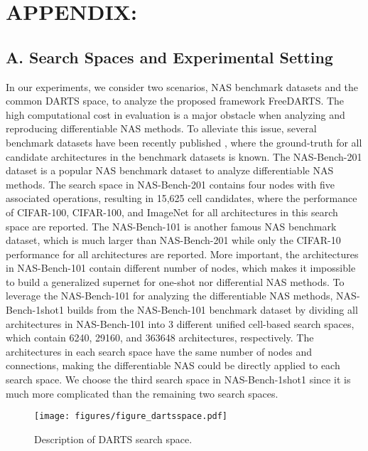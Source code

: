 \documentclass[10pt,twocolumn,letterpaper]{article}
\begin{document}
\section*{APPENDIX:}

\subsection*{A. Search Spaces and Experimental Setting} 


In our experiments, we consider two scenarios, NAS benchmark datasets and the common DARTS space, to analyze the proposed framework FreeDARTS. The high computational cost in evaluation is a major obstacle when analyzing and reproducing differentiable NAS methods. To alleviate this issue, several benchmark datasets have been recently published \cite{ying2019bench,BENCH102,zela2020nasbench1shot1,siems2020bench}, where the ground-truth for all candidate architectures in the benchmark datasets is known. The NAS-Bench-201 dataset \cite{BENCH102} is a popular NAS benchmark dataset to analyze differentiable NAS methods. The search space in NAS-Bench-201 contains four nodes with five associated operations, resulting in 15,625 cell candidates, where the performance of CIFAR-100, CIFAR-100, and ImageNet for all architectures in this search space are reported. The NAS-Bench-101 \cite{ying2019bench} is another famous NAS benchmark dataset, which is much larger than NAS-Bench-201 while only the CIFAR-10 performance for all architectures are reported. More important, the architectures in NAS-Bench-101 contain different number of nodes, which makes it impossible to build a generalized supernet for one-shot nor differential NAS methods. To leverage the NAS-Bench-101 for analyzing the differentiable NAS methods, NAS-Bench-1shot1 \cite{zela2020nasbench1shot1} builds from the NAS-Bench-101 benchmark dataset by dividing all architectures in NAS-Bench-101 into 3 different unified cell-based search spaces, which contain 6240, 29160, and 363648 architectures, respectively. The architectures in each search space have the same number of nodes and connections, making the differentiable NAS could be directly applied to each search space. We choose the third search space in NAS-Bench-1shot1 since it is much more complicated than the remaining two search spaces. 

\begin{figure}[t]
\centering
  \begin{minipage}{8cm}
      \texttt{[image: figures/figure\_dartsspace.pdf]}
  \end{minipage}
 \caption{Description of DARTS search space.}
 \label{fig:darts_search_space}
\end{figure}
\end{document}
